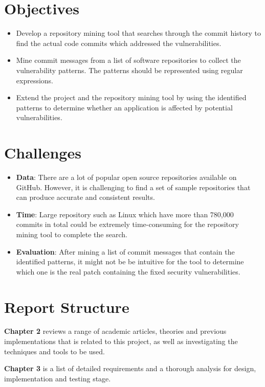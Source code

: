 \documentclass[12pt, a4paper]{report}
\begin{document}
\section{Objectives}
\label{sec:objectives}
\begin{itemize}
	\item Develop a repository mining tool that searches through the commit history to find the actual
	code commits which addressed the vulnerabilities.
	\item Mine commit messages from a list of software repositories to collect the vulnerability
	patterns. The patterns should be represented using regular expressions.
	\item Extend the project and the repository mining tool by using the identified patterns to
	determine whether an application is affected by potential vulnerabilities.
\end{itemize}

\section{Challenges}
\begin{itemize}
	\item \textbf{Data}: There are a lot of popular open source repositories available on GitHub.
	However, it is challenging to find a set of sample repositories that can produce accurate and
	consistent results.
	\item \textbf{Time}: Large repository such as Linux which have more than 780,000 commits in total
	\cite{linux_repo} could be extremely time-consuming for the repository mining tool to complete the
	search.
	\item \textbf{Evaluation}: After mining a list of commit messages that contain the identified
	patterns, it might not be be intuitive for the tool to determine which one is the real patch
	containing the fixed security vulnerabilities.
\end{itemize}

\section{Report Structure}
\textbf{Chapter 2} reviews a range of academic articles, theories and previous implementations that
is related to this project, as well as investigating the techniques and tools to be used.

\noindent\textbf{Chapter 3} is a list of detailed requirements and a thorough analysis for design,
implementation and testing stage.
\end{document}
